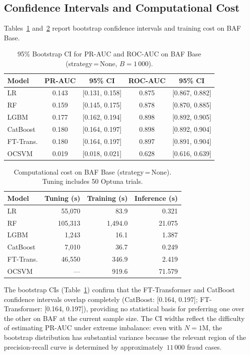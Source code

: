 \documentclass[a4paper,fleqn]{cas-sc}
\begin{document}
\subsection{Confidence Intervals and Computational Cost}
\label{subsec:ci_cost}

Tables~\ref{tab:ci_baf} and~\ref{tab:cost_baf} report bootstrap confidence intervals
and training cost on BAF Base.

\begin{table}[ht!]
\centering
\caption{95\% Bootstrap CI for PR-AUC and ROC-AUC on BAF Base (strategy\,=\,None, $B\!=\!1\,000$).}
\label{tab:ci_baf}
\begin{tabular}{l c c c c}
\toprule
Model & PR-AUC & 95\% CI & ROC-AUC & 95\% CI \\
\midrule
LR         & 0.143 & [0.131, 0.158] & 0.875 & [0.867, 0.882] \\
RF         & 0.159 & [0.145, 0.175] & 0.878 & [0.870, 0.885] \\
LGBM       & 0.177 & [0.162, 0.194] & 0.898 & [0.892, 0.905] \\
CatBoost   & 0.180 & [0.164, 0.197] & 0.898 & [0.892, 0.904] \\
FT-Trans.  & 0.180 & [0.164, 0.197] & 0.897 & [0.891, 0.904] \\
OCSVM      & 0.019 & [0.018, 0.021] & 0.628 & [0.616, 0.639] \\
\bottomrule
\end{tabular}
\end{table}

\begin{table}[ht!]
\centering
\caption{Computational cost on BAF Base (strategy\,=\,None). Tuning includes 50 Optuna trials.}
\label{tab:cost_baf}
\begin{tabular}{l r r r}
\toprule
Model & Tuning (s) & Training (s) & Inference (s) \\
\midrule
LR         & 55,070 & 83.9 & 0.321 \\
RF         & 105,313 & 1,494.0 & 21.075 \\
LGBM       & 1,243 & 16.1 & 1.387 \\
CatBoost   & 7,010 & 36.7 & 0.249 \\
FT-Trans.  & 46,550 & 346.9 & 2.419 \\
OCSVM      & --- & 919.6 & 71.579 \\
\bottomrule
\end{tabular}
\end{table}

The bootstrap CIs (Table~\ref{tab:ci_baf}) confirm that the FT-Transformer and
CatBoost confidence intervals overlap completely (CatBoost: [0.164, 0.197];
FT-Transformer: [0.164, 0.197]), providing no statistical basis for preferring one over
the other on BAF at the current sample size.
The CI widths reflect the difficulty of estimating PR-AUC under extreme imbalance:
even with $N\!=\!1$M, the bootstrap distribution has substantial variance because
the relevant region of the precision-recall curve is determined by approximately~$11\,000$
fraud cases.
\end{document}
